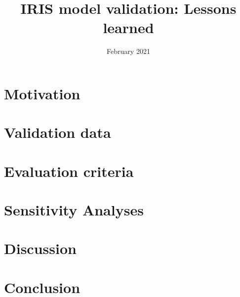 \documentclass[a4paper, 11pt]{scrartcl}
\title{IRIS model validation: Lessons learned}
\date{February 2021}
\begin{document}
\maketitle


\section{Motivation}



\section{Validation data}


\section{Evaluation criteria}


\section{Sensitivity Analyses}


\section{Discussion}



\section{Conclusion}
\end{document}
